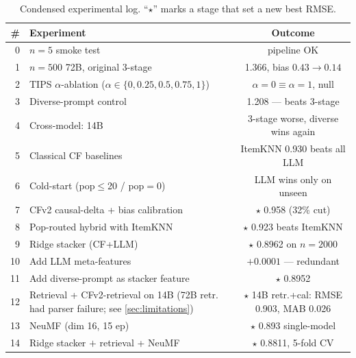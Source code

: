 \documentclass[11pt,a4paper]{article}
\begin{document}
\begin{table}[H]
\centering
\small
\caption{Condensed experimental log. ``$\star$'' marks a stage that set
a new best RMSE.}
\label{tab:journey}
\begin{tabularx}{\linewidth}{rXc}
\toprule
\# & Experiment & Outcome \\
\midrule
0  & $n{=}5$ smoke test                                                         & pipeline OK \\
1  & $n{=}500$ 72B, original 3-stage                                            & 1.366, bias $0.43{\to}0.14$ \\
2  & TIPS $\alpha$-ablation ($\alpha\!\in\!\{0,0.25,0.5,0.75,1\}$)              & $\alpha{=}0 \equiv \alpha{=}1$, null \\
3  & Diverse-prompt control                                                     & 1.208 --- beats 3-stage \\
4  & Cross-model: 14B                                                            & 3-stage worse, diverse wins again \\
5  & Classical CF baselines                                                     & ItemKNN 0.930 beats all LLM \\
6  & Cold-start (pop$\leq$20 / pop$=0$)                                         & LLM wins only on unseen \\
7  & CFv2 causal-delta + bias calibration                                       & $\star$ 0.958 (32\% cut) \\
8  & Pop-routed hybrid with ItemKNN                                             & $\star$ 0.923 beats ItemKNN \\
9  & Ridge stacker (CF+LLM)                                                     & $\star$ 0.8962 on $n{=}2000$ \\
10 & Add LLM meta-features                                                      & $+0.0001$ --- redundant \\
11 & Add diverse-prompt as stacker feature                                      & $\star$ 0.8952 \\
12 & Retrieval + CFv2-retrieval on 14B (72B retr. had parser failure; see \cref{sec:limitations}) & $\star$ 14B retr.+cal: RMSE 0.903, MAB 0.026 \\
13 & NeuMF (dim 16, 15 ep)                                                      & $\star$ 0.893 single-model \\
14 & Ridge stacker $+$ retrieval + NeuMF                                        & $\star$ 0.8811, 5-fold CV \\

\end{tabularx}
\end{table}
\end{document}
